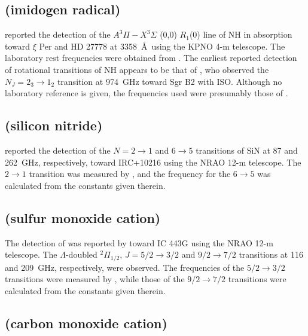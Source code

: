 \documentclass[twocolumn]{aastex631}
\begin{document}
    \subsection{ (imidogen radical)}
    \label{NH}
    
    \citet{Meyer:1991ft} reported the detection of the $A^3\Pi-X^3\Sigma$ (0,0) $R_1$(0) line of NH in absorption toward $\xi$ Per and HD 27778 at 3358~\AA~using the KPNO 4-m telescope.  The laboratory rest frequencies were obtained from \citet{Dixon:1959dp}.  The earliest reported detection of rotational transitions of NH appears to be that of \citet{Cernicharo:2000lq}, who observed the $N_J = 2_3\rightarrow1_2$ transition at 974~GHz toward Sgr B2 with ISO.  Although no laboratory reference is given, the frequencies used were presumably those of \citet{Klaus:1997ku}.
    
    \subsection{ (silicon nitride)}
    \label{SiN}
    
    \citet{Turner:1992kw} reported the detection of the $N=2\rightarrow1$ and $6\rightarrow5$ transitions of SiN at 87 and 262~GHz, respectively, toward IRC+10216 using the NRAO 12-m telescope.  The $2\rightarrow1$ transition was measured by \citet{Saito:1983hc}, and the frequency for the $6\rightarrow5$ was calculated from the constants given therein.  
    
    \subsection{ (sulfur monoxide cation)}
    \label{SO+}
    
    The detection of  was reported by \citet{Turner:1992cj} toward IC 443G using the NRAO 12-m telescope.  The $\Lambda$-doubled $^2\Pi_{1/2}$, $J = 5/2\rightarrow3/2$ and $9/2\rightarrow7/2$ transitions at 116 and 209~GHz, respectively, were observed.  The frequencies of the $5/2\rightarrow3/2$ transitions were measured by \citet{Amano:1991hq}, while those of the $9/2\rightarrow7/2$ transitions were calculated from the constants given therein.
    
    \subsection{ (carbon monoxide cation)}
    \label{CO+}
    
\end{document}
